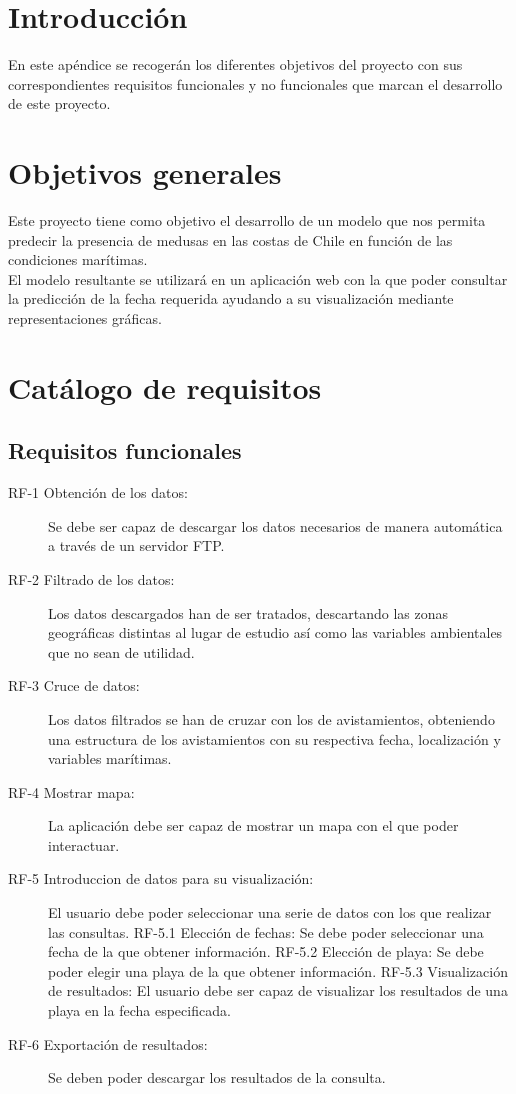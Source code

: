 
\section{Introducción}
En este apéndice se recogerán los diferentes objetivos del proyecto con sus correspondientes requisitos funcionales y no funcionales que marcan el desarrollo de este proyecto.

\section{Objetivos generales}

Este proyecto tiene como objetivo el desarrollo de un modelo que nos permita predecir la presencia de medusas en las costas de Chile en función de las condiciones marítimas.\\
El modelo resultante se utilizará en un aplicación web con la que poder consultar la predicción de la fecha requerida ayudando a su visualización mediante representaciones gráficas.

\section{Catálogo de requisitos}

	\subsection{Requisitos funcionales}

\begin{description}
	\item[RF-1 Obtención de los datos:] Se debe ser capaz de descargar los datos necesarios de manera automática a través de un servidor FTP.
	\item[RF-2 Filtrado de los datos:] Los datos descargados han de ser tratados, descartando las zonas geográficas distintas al lugar de estudio así como las variables ambientales que no sean de utilidad.
	\item[RF-3 Cruce de datos:] Los datos filtrados se han de cruzar con los de avistamientos, obteniendo una estructura de los avistamientos con su respectiva fecha, localización y variables marítimas.	
	\item[RF-4 Mostrar mapa:] La aplicación debe ser capaz de mostrar un mapa con el que poder interactuar.
	\item[RF-5 Introduccion de datos para su visualización:] El usuario debe poder seleccionar una serie de datos con los que realizar las consultas.
	\subitem RF-5.1 Elección de fechas: Se debe poder seleccionar una fecha de la que obtener información.
	\subitem RF-5.2 Elección de playa: Se debe poder elegir una playa de la que obtener información.
	\subitem RF-5.3 Visualización de resultados: El usuario debe ser capaz de visualizar los resultados de una playa en la fecha especificada.	
	\item[RF-6 Exportación de resultados:] Se deben poder descargar los resultados de la consulta.
\end{description}

